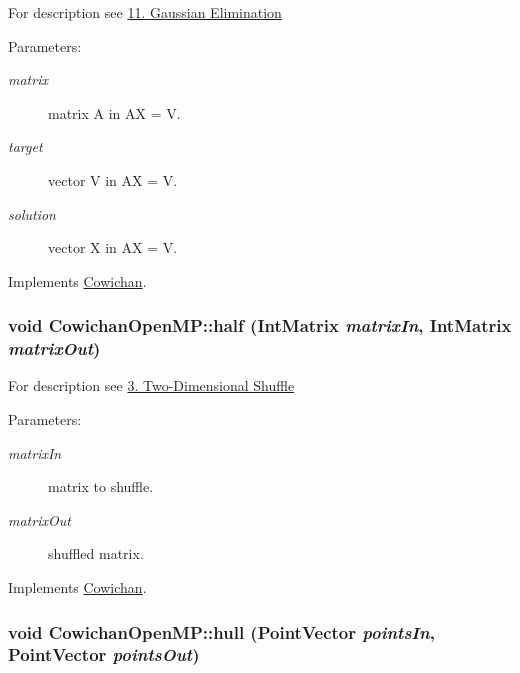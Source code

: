 For description see \hyperlink{index_gauss_sec}{11. Gaussian Elimination} \begin{Desc}
\item[Parameters:]
\begin{description}
\item[{\em matrix}]matrix A in AX = V. \item[{\em target}]vector V in AX = V. \item[{\em solution}]vector X in AX = V. \end{description}
\end{Desc}


Implements \hyperlink{class_cowichan_aa9aac74b96dc5ed33e821d94649d1b2}{Cowichan}.\hypertarget{class_cowichan_open_m_p_70989ffe182aebf590e39c56e146b0fb}{
\subsubsection[{half}]{\setlength{\rightskip}{0pt plus 5cm}void CowichanOpenMP::half ({\bf IntMatrix} {\em matrixIn}, \/  {\bf IntMatrix} {\em matrixOut})}}
\label{class_cowichan_open_m_p_70989ffe182aebf590e39c56e146b0fb}


For description see \hyperlink{index_half_sec}{3. Two-Dimensional Shuffle} \begin{Desc}
\item[Parameters:]
\begin{description}
\item[{\em matrixIn}]matrix to shuffle. \item[{\em matrixOut}]shuffled matrix. \end{description}
\end{Desc}


Implements \hyperlink{class_cowichan_308603053675bccbe631f04af921f57c}{Cowichan}.\hypertarget{class_cowichan_open_m_p_cb444dd3e2c0f1f27f4135de0279d09e}{
\subsubsection[{hull}]{\setlength{\rightskip}{0pt plus 5cm}void CowichanOpenMP::hull ({\bf PointVector} {\em pointsIn}, \/  {\bf PointVector} {\em pointsOut})}}
\label{class_cowichan_open_m_p_cb444dd3e2c0f1f27f4135de0279d09e}


